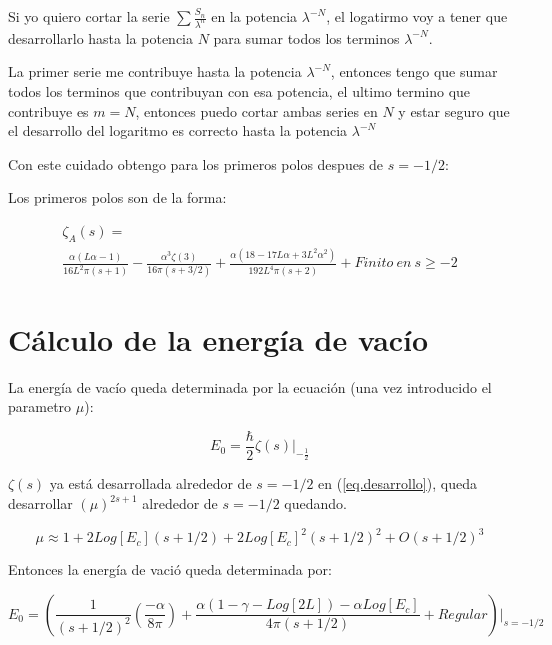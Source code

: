 Si yo quiero cortar la serie $\sum \frac{S _n}{\lambda ^n}$ en la potencia $\lambda ^{-N}$, el logatirmo voy a tener que desarrollarlo hasta la potencia $N$ para sumar todos los terminos $\lambda ^{-N}$.

La primer serie me contribuye hasta la potencia $\lambda ^{-N}$, entonces tengo que sumar todos los terminos que contribuyan con esa potencia, el ultimo termino que contribuye es $m=N$, entonces puedo cortar ambas series en $N$ y estar seguro que el desarrollo del logaritmo es correcto hasta la potencia $\lambda ^{-N}$

Con este cuidado obtengo para los primeros polos despues de $s=-1/2$:

Los primeros polos son de la forma:

\begin{equation}
\begin{array}{c}

\zeta _A (s) = \\
\frac{ \alpha (L \alpha -1) }{16 L ^2 \pi (s+1)} 
- \frac{\alpha ^3 \zeta (3) }{16 \pi (s+3/2)} 
+ \frac{\alpha (18-17L \alpha + 3 L ^2 \alpha ^2 )}{192 L ^4 \pi (s+2)} + Finito \ en \ s \geq -2

\end{array}
\end{equation}

\section{Cálculo de la energía de vacío}

La energía de vacío queda determinada por la ecuación (una vez introducido el parametro $\mu$): 

\begin{equation}
    E _0 = \frac{\hbar}{2}  
    \zeta (s)  |  _{- \frac{1}{2}}
\end{equation}

$\zeta (s)$ ya está desarrollada alrededor de $s=-1/2$ en (\ref{eq.desarrollo}), queda desarrollar $(\mu) ^{2s+1} $ alrededor de $s=-1/2$ quedando.

\begin{equation}
    \mu \approx 
    1 + 2 Log[E_c] (s + 1/2) +
    2 Log[E_c] ^2 (s+1/2) ^2 + 
    O (s+1/2)^3
\end{equation}

Entonces la energía de vació queda determinada por:

\begin{equation}
    E _0 =
    \left(
    \frac{1}{(s+1/2)^2} 
    \left(
    \frac{- \alpha}{8 \pi}
    \right)+
    \frac{
    \alpha(1 -\gamma-Log[2L]) - 
    \alpha Log[E_c] 
    }{4 \pi (s+1/2)} 
     + Regular
    \right) | _{s=-1/2}
\end{equation}\\



 
